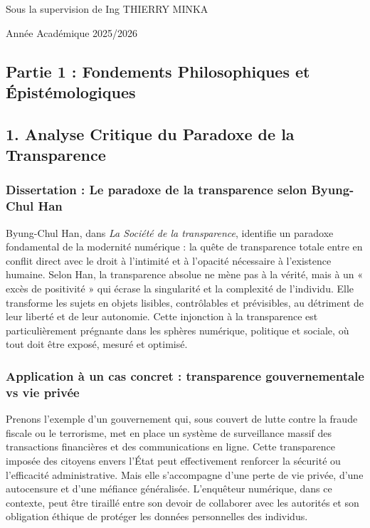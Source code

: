 \documentclass[12pt, a4paper]{article}
\begin{document}
\begin{titlepage}
    \vspace{1cm}
	\begin{Large}
	Sous la supervision de Ing THIERRY MINKA
	\end{Large}
    
    \vspace{1cm}
	\begin{Large}
	Année Académique 2025/2026
	\end{Large}

\end{titlepage}

\begin{LARGE}

\section*{Partie 1 : Fondements Philosophiques et Épistémologiques}

\subsection{1. Analyse Critique du Paradoxe de la Transparence}

\subsubsection*{Dissertation : Le paradoxe de la transparence selon Byung-Chul Han}
Byung-Chul Han, dans \emph{La Société de la transparence}, identifie un paradoxe fondamental de la modernité numérique : la quête de transparence totale entre en conflit direct avec le droit à l'intimité et à l'opacité nécessaire à l'existence humaine. Selon Han, la transparence absolue ne mène pas à la vérité, mais à un « excès de positivité » qui écrase la singularité et la complexité de l'individu. Elle transforme les sujets en objets lisibles, contrôlables et prévisibles, au détriment de leur liberté et de leur autonomie. Cette injonction à la transparence est particulièrement prégnante dans les sphères numérique, politique et sociale, où tout doit être exposé, mesuré et optimisé.

\subsubsection*{Application à un cas concret : transparence gouvernementale vs vie privée}
Prenons l'exemple d'un gouvernement qui, sous couvert de lutte contre la fraude fiscale ou le terrorisme, met en place un système de surveillance massif des transactions financières et des communications en ligne. Cette transparence imposée des citoyens envers l'État peut effectivement renforcer la sécurité ou l'efficacité administrative. Mais elle s'accompagne d'une perte de vie privée, d'une autocensure et d'une méfiance généralisée. L'enquêteur numérique, dans ce contexte, peut être tiraillé entre son devoir de collaborer avec les autorités et son obligation éthique de protéger les données personnelles des individus.


\end{LARGE}
\end{document}
